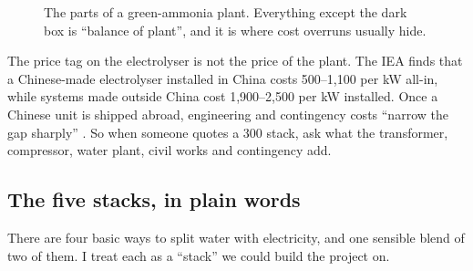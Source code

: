 \begin{figure}[H]
\caption{The parts of a green-ammonia plant. Everything except the dark box is ``balance of plant'', and it is where cost overruns usually hide.}
\end{figure}

\begin{plainwords}
The price tag on the electrolyser is not the price of the plant. The IEA finds that a Chinese-made electrolyser installed in China costs \usd{}500–1,100 per kW all-in, while systems made outside China cost \usd{}1,900–2,500 per kW installed. Once a Chinese unit is shipped abroad, engineering and contingency costs ``narrow the gap sharply'' \cite{argus2026}. So when someone quotes a \usd{}300 stack, ask what the transformer, compressor, water plant, civil works and contingency add. \confH
\end{plainwords}

\subsection{The five stacks, in plain words}

There are four basic ways to split water with electricity, and one sensible blend of two of them. I treat each as a ``stack'' we could build the project on.

